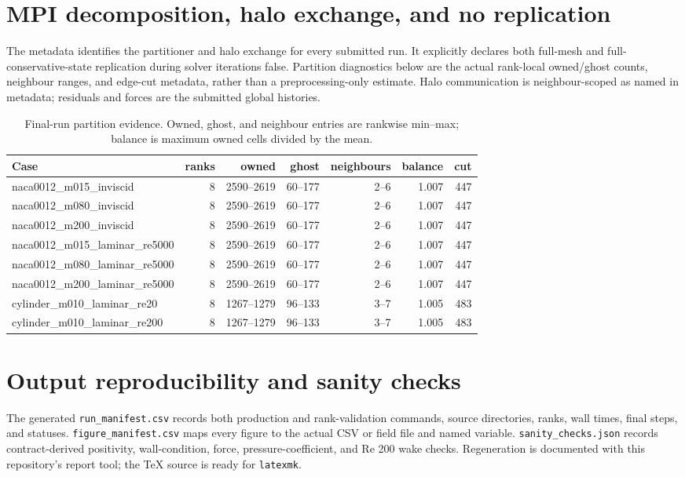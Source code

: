 \documentclass[11pt]{article}
\begin{document}
\section{MPI decomposition, halo exchange, and no replication}
The metadata identifies the partitioner and halo exchange for every submitted run.  It explicitly declares both full-mesh and full-conservative-state replication during solver iterations false.  Partition diagnostics below are the actual rank-local owned/ghost counts, neighbour ranges, and edge-cut metadata, rather than a preprocessing-only estimate.  Halo communication is neighbour-scoped as named in metadata; residuals and forces are the submitted global histories.
\begin{table}[htbp]\centering\small
\caption{Final-run partition evidence.  Owned, ghost, and neighbour entries are rankwise min--max; balance is maximum owned cells divided by the mean.}\label{tab:partition}
\begin{tabular}{lrrrrrr}\toprule Case & ranks & owned & ghost & neighbours & balance & cut\\\midrule
naca0012\_m015\_inviscid & 8 & 2590--2619 & 60--177 & 2--6 & 1.007 & 447 \\
naca0012\_m080\_inviscid & 8 & 2590--2619 & 60--177 & 2--6 & 1.007 & 447 \\
naca0012\_m200\_inviscid & 8 & 2590--2619 & 60--177 & 2--6 & 1.007 & 447 \\
naca0012\_m015\_laminar\_re5000 & 8 & 2590--2619 & 60--177 & 2--6 & 1.007 & 447 \\
naca0012\_m080\_laminar\_re5000 & 8 & 2590--2619 & 60--177 & 2--6 & 1.007 & 447 \\
naca0012\_m200\_laminar\_re5000 & 8 & 2590--2619 & 60--177 & 2--6 & 1.007 & 447 \\
cylinder\_m010\_laminar\_re20 & 8 & 1267--1279 & 96--133 & 3--7 & 1.005 & 483 \\
cylinder\_m010\_laminar\_re200 & 8 & 1267--1279 & 96--133 & 3--7 & 1.005 & 483 \\
\bottomrule\end{tabular}\end{table}
\section{Output reproducibility and sanity checks}
The generated \texttt{run\_manifest.csv} records both production and rank-validation commands, source directories, ranks, wall times, final steps, and statuses.  \texttt{figure\_manifest.csv} maps every figure to the actual CSV or field file and named variable.  \texttt{sanity\_checks.json} records contract-derived positivity, wall-condition, force, pressure-coefficient, and Re 200 wake checks.  Regeneration is documented with this repository's report tool; the TeX source is ready for \texttt{latexmk}.
\end{document}
